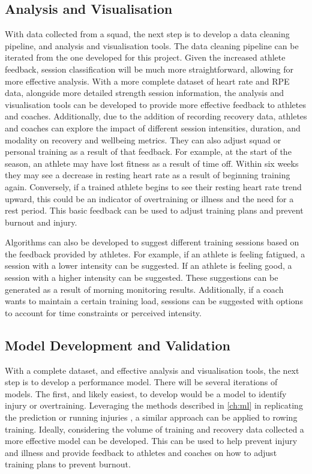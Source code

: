 \subsection{Analysis and Visualisation}
With data collected from a squad, the next step is to develop a data cleaning pipeline, and analysis and visualisation tools. The data cleaning pipeline can be iterated from the one developed for this project. Given the increased athlete feedback, session classification will be much more straightforward, allowing for more effective analysis. With a more complete dataset of heart rate and RPE data, alongside more detailed strength session information, the analysis and visualisation tools can be developed to provide more effective feedback to athletes and coaches. Additionally, due to the addition of recording recovery data, athletes and coaches can explore the impact of different session intensities, duration, and modality on recovery and wellbeing metrics. They can also adjust squad or personal training as a result of that feedback. For example, at the start of the season, an athlete may have lost fitness as a result of time off. Within six weeks they may see a decrease in resting heart rate as a result of beginning training again. Conversely, if a trained athlete begins to see their resting heart rate trend upward, this could be an indicator of overtraining or illness and the need for a rest period. This basic feedback can be used to adjust training plans and prevent burnout and injury.

Algorithms can also be developed to suggest different training sessions based on the feedback provided by athletes. For example, if an athlete is feeling fatigued, a session with a lower intensity can be suggested. If an athlete is feeling good, a session with a higher intensity can be suggested. These suggestions can be generated as a result of morning monitoring results. Additionally, if a coach wants to maintain a certain training load, sessions can be suggested with options to account for time constraints or perceived intensity.

\subsection{Model Development and Validation}
With a complete dataset, and effective analysis and visualisation tools, the next step is to develop a performance model. There will be several iterations of models. The first, and likely easiest, to develop would be a model to identify injury or overtraining. Leveraging the methods described in \autoref{ch:ml} in replicating the prediction or running injuries \cite{Lovdal2021}, a similar approach can be applied to rowing training. Ideally, considering the volume of training and recovery data collected a more effective model can be developed. This can be used to help prevent injury and illness and provide feedback to athletes and coaches on how to adjust training plans to prevent burnout.

